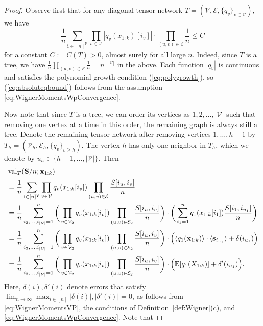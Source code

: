 \documentclass[10pt,reqno]{amsart}
\def\cV{\mathcal{V}}
\def\cE{\mathcal{E}}
\def\val{\operatorname{val}}
\def\bbE{{\mathbb{E}}}
\def\bi{\mathbf{i}}
\def\bx{\mathbf{x}}
\def\bs{\mathbf{s}}
\def\calE{\mathcal{E}}
\def\calV{\mathcal{V}}
\begin{document}
\begin{proof}
Observe first that for any diagonal tensor network
$T=(\cV,\cE,\{q_v\}_{v \in \cV})$, we have
\begin{equation}\label{eq:absoluteqbound}
\frac{1}{n}\sum_{\bi \in [n]^{\cV}}
\prod_{v \in \cV} |q_v(x_{1:k})[i_v]| \cdot \prod_{(u,v) \in \cE} \frac{1}{n}
\leq C
\end{equation}
for a constant $C:=C(T)>0$, almost surely for all large $n$.
Indeed, since $T$ is a tree, 
we have $\frac{1}{n}\prod_{(u,v) \in \cE} \frac{1}{n}=n^{-|\cV|}$
in the above. Each function $|q_v|$ is continuous and satisfies the polynomial
growth condition (\ref{eq:polygrowth}), so (\ref{eq:absoluteqbound}) follows
from the assumption \eqref{eq:WignerMomentsWpConvergence}.

Now note that since $T$ is a tree, we can order its vertices as 
$1,2,\ldots,|\calV|$ such that removing one vertex at a time in this order,
the remaining graph is always still a tree. Denote the remaining tensor network
after removing vertices $1,\ldots,h-1$ by $T_h=(\calV_h,\calE_h,\{q_v\}_{v \geq h})$. 
The vertex $h$ has only one neighbor in $T_h$, which we denote by 
$u_h \in \{h+1,\ldots,|\calV|\}$. Then
\begin{align*}
&\val_{T}(\bS/n; \bx_{1:k})\\
&=\frac{1}{n}\sum_{\bi \in [n]^{\calV}} \prod_{v\in\calV} q_v(x_{1:k}[i_v]) 
\prod_{(u,v)\in\calE} \frac{S[i_u,i_v]}{n}\\
& =\frac{1}{n} \sum_{i_2, \ldots, i_{|\cV|} = 1}^n \bigg( \prod_{v\in\calV_2} q_v(x_{1:k}[i_v]) 
\prod_{(u,v) \in \calE_2} \frac{S[i_u,i_v]}{n} \bigg) 
\cdot \bigg(\sum_{i_1=1}^n q_1(x_{1:k}[i_1]) \frac{S[i_1,i_{u_1}]}{n} \bigg)\\
& = \frac{1}{n} \sum_{i_2, \ldots, i_{|\cV|} = 1}^n 
\bigg( \prod_{v \in \calV_2} q_v(x_{1:k}[i_v]) \prod_{(u,v) \in \calE_2} \frac{S[i_u,i_v]}{n}  \bigg) 
\cdot \Big(\langle q_1(\bx_{1:k}) \rangle \cdot \langle \bs_{i_{u_1}}\rangle +
\delta(i_{u_1})\Big) \\
& = \frac{1}{n}\sum_{i_2, \ldots, i_{|\cV|} = 1}^n 
\bigg( \prod_{v \in \calV_2} q_v(x_{1:k}[i_v]) \prod_{(u,v) \in \calE_2} \frac{S[i_u,i_v]}{n}  \bigg) 
\cdot \Big( \bbE[q_1(X_{1:k})] + \delta'(i_{u_1})\Big).
\end{align*}
Here, $\delta(i),\delta'(i)$ denote errors that 
satisfy $\lim_{n \to \infty} \max_{i \in [n]} |\delta(i)|,|\delta'(i)|=0$,
as follows from \eqref{eq:WignerMomentsVP},
the conditions of Definition~\ref{def:Wigner}(c), and
\eqref{eq:WignerMomentsWpConvergence}. Note that

\end{proof}
\end{document}
